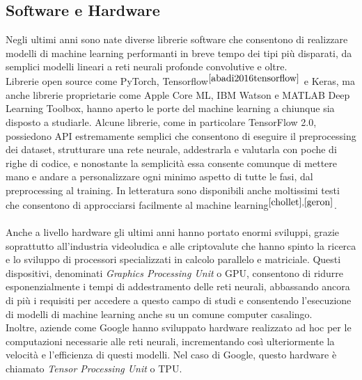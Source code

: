 \subsection{Software e Hardware}
Negli ultimi anni sono nate diverse librerie software che consentono di realizzare modelli di machine learning performanti in breve tempo dei tipi più disparati, da semplici modelli lineari a reti neurali profonde convolutive e oltre.\\
Librerie open source come PyTorch, Tensorflow$^{\cite{abadi2016tensorflow}}$ e Keras, ma anche librerie proprietarie come Apple Core ML, IBM Watson e MATLAB Deep Learning Toolbox, hanno aperto le porte del machine learning a chiunque sia disposto a studiarle. Alcune librerie, come in particolare TensorFlow 2.0, possiedono API estremamente semplici che consentono di eseguire il preprocessing dei dataset, strutturare una rete neurale, addestrarla e valutarla con poche di righe di codice, e nonostante la semplicità essa consente comunque di mettere mano e andare a personalizzare ogni minimo aspetto di tutte le fasi, dal preprocessing al training. In letteratura sono disponibili anche moltissimi testi che consentono di approcciarsi facilmente al machine learning$^{\cite{chollet},\cite{geron}}$.\\\\
Anche a livello hardware gli ultimi anni hanno portato enormi sviluppi, grazie soprattutto all'industria videoludica e alle criptovalute che hanno spinto la ricerca e lo sviluppo di processori specializzati in calcolo parallelo e matriciale. Questi dispositivi, denominati \textit{Graphics Processing Unit} o GPU, consentono di ridurre esponenzialmente i tempi di addestramento delle reti neurali, abbassando ancora di più i requisiti per accedere a questo campo di studi e consentendo l'esecuzione di modelli di machine learning anche su un comune computer casalingo.\\
Inoltre, aziende come Google hanno sviluppato hardware realizzato ad hoc per le computazioni necessarie alle reti neurali, incrementando così ulteriormente la velocità e l'efficienza di questi modelli. Nel caso di Google, questo hardware è chiamato \textit{Tensor Processing Unit} o TPU.
\pagebreak
